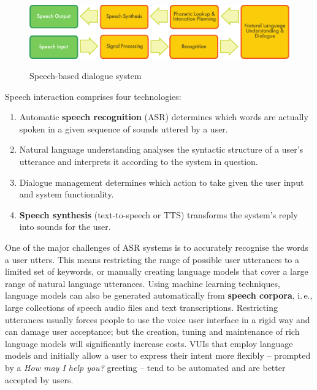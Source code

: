 \begin{multicols}{2}

\begin{figure}[htb]
  \center
  \includegraphics[width=\textwidth]{../_media/english/simple_speech-based_dialogue_architecture}
  \caption{Speech-based dialogue system}
   \label{fig:dialoguearch_en}
\end{figure}

Speech interaction comprises four technologies: 

\begin{enumerate}
\item Automatic \textbf{speech recognition} (ASR) determines which words are actually spoken in a given sequence of sounds uttered by a user.  
\item Natural language understanding analyses the syntactic structure of a user's utterance and interprets it according to the system in question.  
\item Dialogue management determines which action to take given the user input and system functionality.
\item \textbf{Speech synthesis} (text-to-speech or TTS) transforms the system's reply into sounds for the user. 
\end{enumerate}

One of the major challenges of ASR systems is to accurately recognise the words a user utters.
This means restricting the range of possible user utterances to a limited set of keywords, or manually creating language models that cover a large range of natural language utterances.
Using machine learning techniques, language models can also be generated automatically from \textbf{speech corpora}, i.\,e., large collections of speech audio files and text transcriptions.
Restricting utterances usually forces people to use the voice user interface in a rigid way and can damage user acceptance; but the creation, tuning and maintenance of rich language models will significantly increase costs.
VUIs that employ language models and initially allow a user to express their intent more flexibly -- prompted by a \textit{How may I help you?} greeting -- tend to be automated and are better accepted by users. 


\end{multicols}
